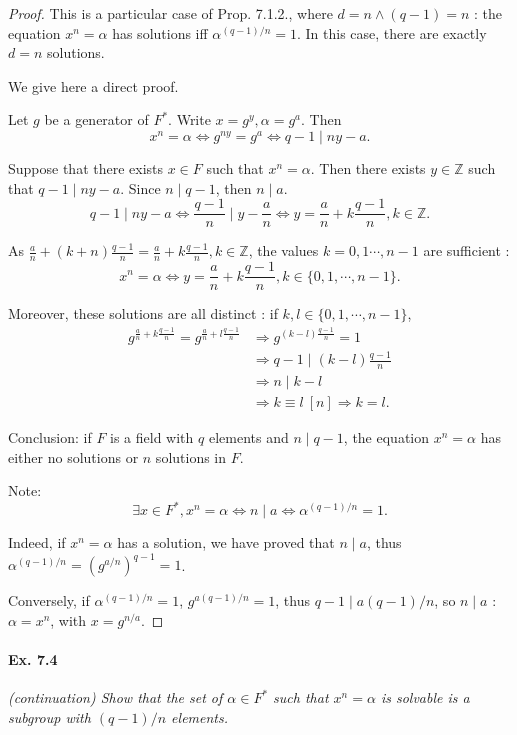 \documentclass[11pt,a4paper]{article}
\newcommand{\Z}{\mathbb{Z}}
\begin{document}
\begin{proof} This is a particular case of Prop. 7.1.2., where $d = n \wedge (q-1) = n$ : the equation $x^n =\alpha$ has solutions iff $\alpha^{(q-1)/n} = 1$. In this case, there are exactly $d = n$ solutions.

We give  here a direct proof.

Let $g$ be a generator of $F^*$.  Write $x = g^y, \alpha = g^a$. Then
$$x^n = \alpha \iff g^{ny} = g^a\iff q-1 \mid ny -a.$$

Suppose that there exists $x\in F$ such that $x^n = \alpha$. Then there exists $y\in \Z$ such that $q-1 \mid ny -a$. Since $n \mid q-1$, then  $n \mid a$.
$$q-1 \mid ny -a \iff \frac{q-1}{n} \mid y - \frac{a}{n}\iff y= \frac{a}{n} + k \frac{q-1}{n}, k\in \mathbb{Z}.$$

As  $\frac{a}{n} + (k+n) \frac{q-1}{n} = \frac{a}{n} + k \frac{q-1}{n}, k\in \mathbb{Z}$, the values $k=0,1\cdots,n-1 $ are sufficient :
$$x^n=\alpha \iff y = \frac{a}{n} + k \frac{q-1}{n}, k\in \{0,1,\cdots,n-1\}.$$

Moreover, these solutions are all distinct : if $k,l\in  \{0,1,\cdots,n-1\}$,
\begin{align*}
g^{\frac{a}{n} + k \frac{q-1}{n}} = g^{\frac{a}{n} + l \frac{q-1}{n}} & \Rightarrow g^{(k-l) \frac{q-1}{n}} = 1\\
&\Rightarrow q-1 \mid (k-l) \frac{q-1}{n}\\
& \Rightarrow n \mid k-l \\
&\Rightarrow k\equiv l \ [n] \Rightarrow k=l.
\end{align*}

Conclusion: if  $F$ is a field with $q$ elements and $n \mid q-1$, the equation $x^n = \alpha$ has either no solutions or $n$ solutions in $F$.

Note: $$\exists x \in F^*, x^n = \alpha \iff n \mid a \iff \alpha^{(q-1)/n} = 1.$$

Indeed, if $x^n = \alpha$ has a solution, we have proved that $n\mid a$, thus $\alpha^{(q-1)/n} = (g^{a/n})^{q-1} = 1$.

Conversely, if $\alpha^{(q-1)/n} = 1$, $g^{a(q-1)/ n }=1$, thus $q-1 \mid a(q-1)/n$, so $ n \mid a$ :  $\alpha = x^n$, with $x = g^{n/a}$.
\end{proof}

\paragraph{Ex. 7.4}

{\it (continuation) Show that the set of $\alpha \in F^*$ such that $x^n = \alpha$ is solvable is a subgroup with $(q-1)/n$ elements.
}
\end{document}
